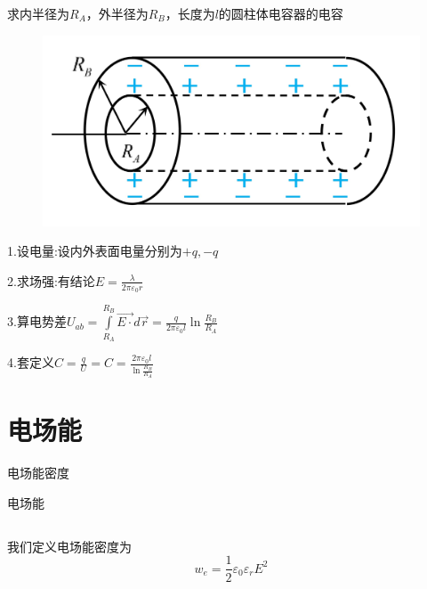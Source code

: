 \documentclass[lang=cn,10pt]{elegantbook}
\begin{document}
		\begin{example}
			求内半径为$R_{A}$，外半径为$R_{B}$，长度为$l$的圆柱体电容器的电容
\begin{figure}[H]
	\centering
	\includegraphics[width=0.18\linewidth]{image/IMG_0421(20231118-140235)}
	\caption{}
	\label{fig:img042120231118-140235}
\end{figure}
		\end{example}
		\begin{solution}
			1.设电量:设内外表面电量分别为$+q,-q$
			
			2.求场强:有结论$E=\frac{\lambda}{2\pi\varepsilon_{0}r}$
			
			3.算电势差$U_{ab}=\int\limits_{R_A}^{R_B}{\overrightarrow{E\cdot }d\overrightarrow{r}}=\frac{q}{2\pi \varepsilon _0l}\ln \frac{R_B}{R_A}$
			
			4.套定义$C=\frac{q}{U}=C=\frac{2\pi \varepsilon _0l}{\ln \frac{R_B}{R_A}}$
		\end{solution}
		\section{电场能}
		\begin{introduction}
			\item 电场能密度
			\item 电场能
		\end{introduction}
		\subsection{\color{red}}
		\begin{definition}
			我们定义电场能密度为
			\begin{equation*}
				w_{e}=\frac{1}{2}\varepsilon_{0}\varepsilon_{r}E^{2}
			\end{equation*}
		\end{definition}
\end{document}
